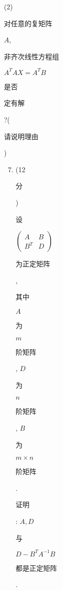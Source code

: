 \documentclass[10pt]{article}
\begin{document}
(2) \begin{CJK}{UTF8}{mj}对任意的复矩阵\end{CJK} $A$, \begin{CJK}{UTF8}{mj}非齐次线性方程组\end{CJK} $A^{T} A X=A^{T} B$ \begin{CJK}{UTF8}{mj}是否\end{CJK} \begin{CJK}{UTF8}{mj}定有解\end{CJK}?(\begin{CJK}{UTF8}{mj}请说明理由\end{CJK})

\begin{enumerate}
  \setcounter{enumi}{6}
  \item (12 \begin{CJK}{UTF8}{mj}分\end{CJK}) \begin{CJK}{UTF8}{mj}设\end{CJK} $\left(\begin{array}{ll}A & B \\ B^{T} & D\end{array}\right)$ \begin{CJK}{UTF8}{mj}为正定矩阵\end{CJK}, \begin{CJK}{UTF8}{mj}其中\end{CJK} $A$ \begin{CJK}{UTF8}{mj}为\end{CJK} $m$ \begin{CJK}{UTF8}{mj}阶矩阵\end{CJK}, $D$ \begin{CJK}{UTF8}{mj}为\end{CJK} $n$ \begin{CJK}{UTF8}{mj}阶矩阵\end{CJK}, $B$ \begin{CJK}{UTF8}{mj}为\end{CJK} $m \times n$ \begin{CJK}{UTF8}{mj}阶矩阵\end{CJK}. \begin{CJK}{UTF8}{mj}证明\end{CJK}: $A, D$ \begin{CJK}{UTF8}{mj}与\end{CJK} $D-B^{T} A^{-1} B$ \begin{CJK}{UTF8}{mj}都是正定矩阵\end{CJK}.


\end{enumerate}
\end{document}
